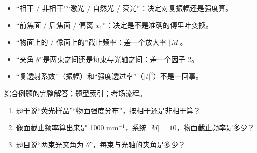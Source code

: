 \begin{warn}[读题时最容易漏的几个词]
\begin{itemize}
\item “相干 / 非相干”“激光 / 自然光 / 荧光”：决定对复振幅还是强度算。
\item “前焦面 / 后焦面 / 偏离 $x_1$”：决定是不是准确的傅里叶变换。
\item “物面上的 / 像面上的”截止频率：差一个放大率 $|M|$。
\item “夹角 $\theta$”是两束之间还是每束与光轴之间：差一个因子 2。
\item “复透射系数”（振幅）和“强度透过率”（$|t|^2$）不是一回事。
\end{itemize}
\end{warn}

\psee 综合例题的完整解答\pageref{ch:examples}；题型索引\pageref{tab:typeindex}；考场流程\pageref{sec:examflow}。

\begin{enumerate}[label=\arabic*.]
\item 题干说“荧光样品”“物面强度分布”，按相干还是非相干算？
\item 像面截止频率算出来是 1000 mm$^{-1}$，系统 $|M|=10$，物面截止频率是多少？
\item 题目说“两束光夹角为 $\theta$”，每束与光轴的夹角是多少？
\end{enumerate}
